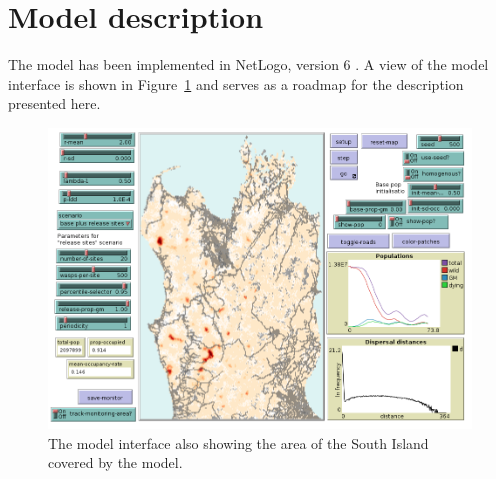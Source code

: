 \documentclass[11pt]{article}
\begin{document}
\section{Model description}\label{sec:model-description}
The model has been implemented in NetLogo, version 6 \citep{Wilensky1999}.
A view of the model interface is shown in Figure~\ref{fig:interface} and serves as a roadmap for the description presented here.
\par
\begin{figure}
  \begin{center}
    \includegraphics[width=\textwidth]{wasps_interface}
    \caption{The model interface also showing the area of the South Island covered by the model.}\label{fig:interface}
  \end{center}
\end{figure} %
\end{document}
